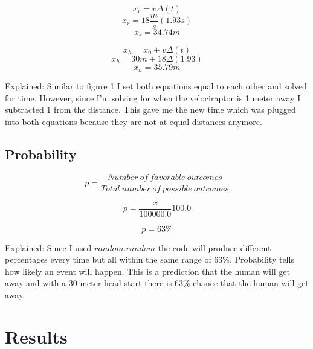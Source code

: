 \documentclass[twocolumn]{revtex4}
\begin{document}
$$x_r = v \Delta(t)$$
$$x_r = 18 \frac{m}{s}(1.93s)$$
$$x_r = 34.74m$$

$$x_h = x_0 + v\Delta(t)$$
$$x_h = 30m + 18\Delta(1.93)$$
$$x_h = 35.79m$$

Explained:
Similar to figure 1 I set both equations equal to each other and solved for time. However, since I'm solving for when the velociraptor is 1 meter away I subtracted 1 from the distance. This gave me the new time which was plugged into both equations because they are not at equal distances anymore. 
 \subsection{Probability} 

$$ p =  \frac{Number ~of~ favorable~ outcomes}{Total~ number ~of~ possible~ outcomes}$$

$$ p = \frac{x}{100000.0} 100.0$$

$$ p = 63\%$$

Explained:
Since I used $random.random$ the code will produce different percentages every time but all within the same range of 63\%. Probability tells how likely an event will happen. This is a prediction that the human will get away and with a 30 meter head start there is 63\% chance that the human will get away. 


\section{Results}
\end{document}
